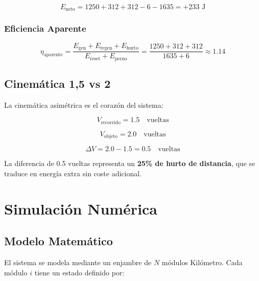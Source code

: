 \documentclass[12pt,a4paper]{article}
\begin{document}
\begin{equation}
E_{\text{neto}} = 1250 + 312 + 312 - 6 - 1635 = +233 \text{ J}
\end{equation}

\subsubsection{Eficiencia Aparente}

\begin{equation}
\eta_{\text{aparente}} = \frac{E_{\text{gen}} + E_{\text{regen}} + E_{\text{hurto}}}{E_{\text{reset}} + E_{\text{perno}}} = \frac{1250 + 312 + 312}{1635 + 6} \approx 1.14
\end{equation}

\subsection{Cinemática 1,5 vs 2}

La cinemática asimétrica es el corazón del sistema:

\begin{equation}
V_{\text{recorrido}} = 1.5 \quad \text{vueltas}
\end{equation}

\begin{equation}
V_{\text{objeto}} = 2.0 \quad \text{vueltas}
\end{equation}

\begin{equation}
\Delta V = 2.0 - 1.5 = 0.5 \quad \text{vueltas}
\end{equation}

La diferencia de 0.5 vueltas representa un \textbf{25\% de hurto de distancia}, que se traduce en energía extra sin coste adicional.

\section{Simulación Numérica}

\subsection{Modelo Matemático}

El sistema se modela mediante un enjambre de $N$ módulos Kilómetro. Cada módulo $i$ tiene un estado definido por:
\end{document}
